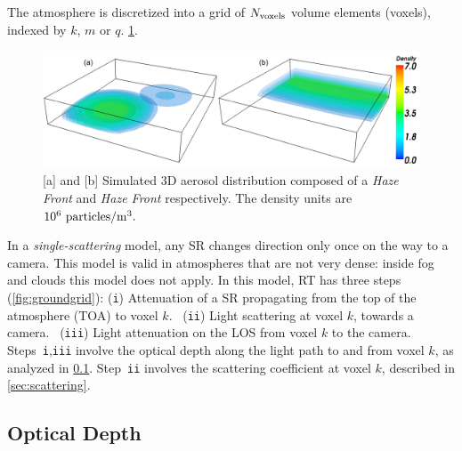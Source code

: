 \documentclass[10pt,letterpaper]{article}
\newcommand{\yoavcomment}[1]{}
\renewcommand{\yoavcomment}[1]{#1} %
\begin{document}
The atmosphere is discretized into a grid of $N_{\rm voxels}$ volume
elements (voxels), indexed by $k$, $m$ or $q$. \cref{fig:distributions}.
\begin{figure}
  \centering
  \yoavcomment{\includegraphics[width=\columnwidth]{images/distributions}}
  \caption{\small [a] and [b] Simulated 3D aerosol distribution
    composed of a {\em Haze Front} and {\em Haze Front}
    respectively. The density units are $10^{6}~{\rm particles}/{\rm
      m}^3.$}
  \label{fig:distributions}
\end{figure}
In a \emph{single-scattering} model, any SR changes direction only
once on the way to a camera. This model is valid in atmospheres that
are not very dense: inside fog and clouds this model does not
apply. In this model, RT has three steps (\cref{fig:groundgrid}):
({\tt i}) Attenuation of a SR propagating from the top of the
atmosphere (TOA) to voxel $k$. ~({\tt ii}) Light scattering at voxel
$k$, towards a camera. ~({\tt iii}) Light attenuation on the LOS from
voxel $k$ to the camera.~~ Steps~{\tt i},{\tt iii} involve the optical
depth along the light path to and from voxel $k$, as analyzed in
\cref{sec:optical-depth}.  Step~{\tt ii} involves the scattering
coefficient at voxel $k$, described in \cref{sec:scattering}.


\subsection{Optical Depth}
\label{sec:optical-depth}
\end{document}
